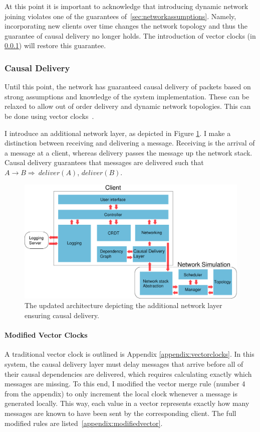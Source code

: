 \documentclass[12pt,a4paper,twoside,openright]{report}
\begin{document}
		At this point it is important to acknowledge that introducing dynamic network joining violates one of the guarantees of~\cref{sec:networkassumptions}. Namely, incorporating new clients over time changes the network topology and thus the guarantee of causal delivery no longer holds. The introduction of vector clocks (in \cref{sec:causaldelivery}) will restore this guarantee.
		
		\subsubsection{Causal Delivery} \label{sec:causaldelivery}
		Until this point, the network has guaranteed causal delivery of packets based on strong assumptions and knowledge of the system implementation. These can be relaxed to allow out of order delivery and dynamic network topologies. This can be done using vector clocks~\cite{fidge1987}.
		
		I introduce an additional network layer, as depicted in Figure \ref{fig:causal}. I make a distinction between receiving and delivering a message. Receiving is the arrival of a message at a client, whereas delivery passes the message up the network stack. Causal delivery guarantees that messages are delivered such that $A \rightarrow B \Rightarrow\ deliver(A)$, $deliver(B)$.
		

	\begin{figure}[H]
	\centering
	\includegraphics[width=1\linewidth]{figs/causal_arch_2.eps}
	\caption[Ensuring Causal Delivery]{The updated architecture depicting the additional network layer ensuring causal delivery.}
	\label{fig:causal}
	\end{figure}

	
		\paragraph{Modified Vector Clocks} \label{sec:modifiedvectors}
		A traditional vector clock is outlined is Appendix \ref{appendix:vectorclocks}. In this system, the causal delivery layer must delay messages that arrive before all of their causal dependencies are delivered, which requires calculating exactly which messages are missing. To this end, I modified the vector merge rule (number 4 from the appendix) to only increment the local clock whenever a message is generated locally. This way, each value in a vector represents exactly how many messages are known to have been sent by the corresponding client. The full modified rules are listed~\cref{appendix:modifiedvector}.
		
\end{document}

